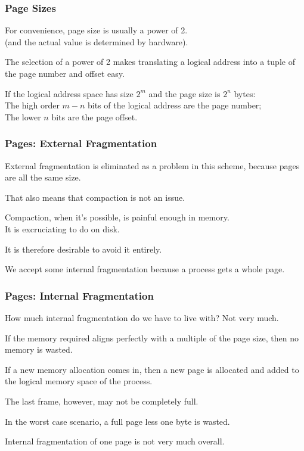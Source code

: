 \begin{frame}
\frametitle{Page Sizes}

For convenience, page size is usually a power of 2.\\
\quad (and the actual value is determined by hardware). 

The selection of a power of 2 makes translating a logical address into a tuple of the page number and offset easy. 

If the logical address space has size $2^{m}$ and the page size is $2^{n}$ bytes:\\
\quad The high order $m - n$ bits of the logical address are the page number;\\
\quad The lower $n$ bits are the page offset. 


\end{frame}

\begin{frame}
\frametitle{Pages: External Fragmentation}

External fragmentation is eliminated as a problem in this scheme, because pages are all the same size. 

That also means that compaction is not an issue. 

Compaction, when it's possible, is painful enough in memory. \\
\quad It is excruciating to do on disk. 

It is therefore desirable to avoid it entirely. 

We accept some internal fragmentation because a process gets a whole page. 


\end{frame}

\begin{frame}
\frametitle{Pages: Internal Fragmentation}

How much internal fragmentation do we have to live with? Not very much. 

If the memory required aligns perfectly with a multiple of the page size, then no memory is wasted. 

If a new memory allocation comes in, then a new page is allocated and added to the logical memory space of the process. 

The last frame, however, may not be completely full. 

In the worst case scenario, a full page less one byte is wasted. 

Internal fragmentation of one page is not very much overall.


\end{frame}

